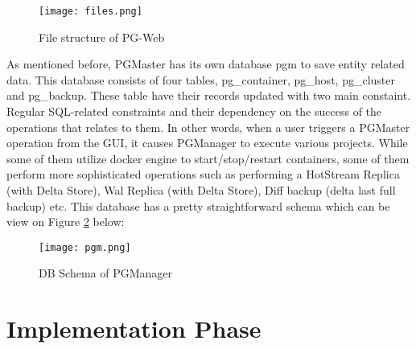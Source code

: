 \begin{figure}
    \centering
    \texttt{[image: files.png]}
    \caption{File structure of PG-Web}
    \label{fig:files}
\end{figure}

\par
As mentioned before, PGMaster has its own database pgm to save entity 
related data. This database consists of four tables, pg_container, pg_host,
pg_cluster and pg_backup. These table have their records updated with two 
main constaint. Regular SQL-related constraints and their dependency on 
the success of the operations that relates to them. In other words, when a 
user triggers a PGMaster operation from the GUI, it causes PGManager to 
execute various projects. While some of them utilize docker engine to 
start/stop/restart containers, some of them perform more sophisticated 
operations such as performing a HotStream Replica (with Delta Store), Wal 
Replica (with Delta Store), Diff backup (delta last full backup) etc. This 
database has a pretty straightforward schema which can be view on Figure 
\ref{fig:schema} below:

\begin{figure}
    \centering
    \texttt{[image: pgm.png]}
    \caption{DB Schema of PGManager}
    \label{fig:schema}
\end{figure}

\section{Implementation Phase}
